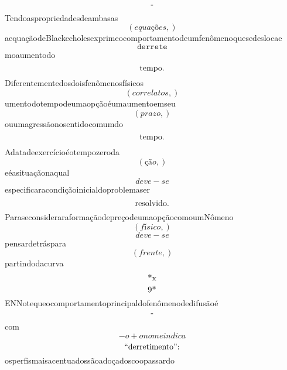 \documentclass{article}
\begin{document}
\begin{equation}
$-$
\end{equation}Tendoaspropriedadesdeambasas\begin{equation}
\left( equações,\right)
\end{equation}aequaçãodeBlackecholesexprimeocomportamentodeumfenômenoquesedeslocae\begin{equation}
\mathtt{\text{derrete}}
\end{equation}moaumentodo\begin{equation}
$tempo.$
\end{equation}Diferentementedosdoisfenômenosfísicos\begin{equation}
\left( correlatos,\right)
\end{equation}umentodotempodeumaopçãoéumaumentoemseu\begin{equation}
\left( prazo,\right)
\end{equation}ouumagressãonosentidocomumdo\begin{equation}
$tempo.$
\end{equation}Adatadeexercícioéotempozeroda\begin{equation}
\left( ção,\right)
\end{equation}eéasituaçãonaqual\begin{equation}
deve - se
\end{equation}especificaracondiçãoinicialdoproblemaser\begin{equation}
$resolvido.$
\end{equation}ParaseconsideraraformaçãodepreçodeumaopçãocomoumNômeno\begin{equation}
\left( físico,\right)
\end{equation}\begin{equation}
deve - se
\end{equation}pensardetráspara\begin{equation}
\left( frente,\right)
\end{equation}partindodacurva\begin{equation}
$*x$
\end{equation}\begin{equation}
$9*$
\end{equation}ENNotequeocomportamentoprincipaldofenômenodedifusãoé\begin{equation}
$-$
\end{equation}com\begin{equation}
- o + onomeindica
\end{equation}\begin{equation}
$“derretimento”:$
\end{equation}osperfismaisacentuadossãoadoçadoscoopassardo\begin{equation}

\end{equation}
\end{document}
